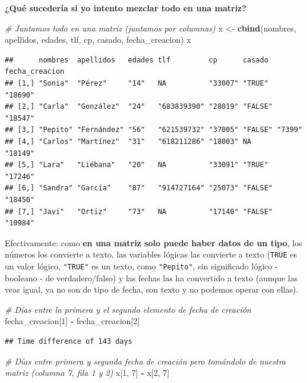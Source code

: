 \documentclass[11pt,]{book}
\newenvironment{Shaded}{\begin{snugshade}}{\end{snugshade}}
\newcommand{\CommentTok}[1]{\textcolor[rgb]{0.37,0.37,0.37}{\textit{#1}}}
\newcommand{\DecValTok}[1]{\textcolor[rgb]{0.06,0.06,0.06}{#1}}
\newcommand{\KeywordTok}[1]{\textcolor[rgb]{0.27,0.27,0.27}{\textbf{#1}}}
\newcommand{\NormalTok}[1]{#1}
\newcommand{\OperatorTok}[1]{\textcolor[rgb]{0.43,0.43,0.43}{\textbf{#1}}}
\newcommand{\StringTok}[1]{\textcolor[rgb]{0.5,0.5,0.5}{#1}}
\begin{document}
\textbf{¿Qué sucedería si yo intento mezclar todo en una matriz?}

\begin{Shaded}
\begin{Highlighting}[]
\CommentTok{# Juntamos todo en una matriz (juntamos por columnas)}
\NormalTok{x <-}\StringTok{ }\KeywordTok{cbind}\NormalTok{(nombres, apellidos, edades, tlf, cp, casado, fecha_creacion)}
\NormalTok{x}
\end{Highlighting}
\end{Shaded}

\begin{verbatim}
##      nombres  apellidos   edades tlf         cp      casado  fecha_creacion
## [1,] "Sonia"  "Pérez"     "14"   NA          "33007" "TRUE"  "18690"       
## [2,] "Carla"  "González"  "24"   "683839390" "28019" "FALSE" "18547"       
## [3,] "Pepito" "Fernández" "56"   "621539732" "37005" "FALSE" "7399"        
## [4,] "Carlos" "Martínez"  "31"   "618211286" "18003" NA      "18149"       
## [5,] "Lara"   "Liébana"   "20"   NA          "33091" "TRUE"  "17246"       
## [6,] "Sandra" "García"    "87"   "914727164" "25073" "FALSE" "18450"       
## [7,] "Javi"   "Ortiz"     "73"   NA          "17140" "FALSE" "10984"
\end{verbatim}

Efectivamente: como \textbf{en una matriz solo puede haber datos de un tipo}, los números los convierte a texto, las variables lógicas las convierte a texto (\texttt{TRUE} es un valor lógico, \texttt{"TRUE"} es un texto, como \texttt{"Pepito"}, sin significado lógico - booleano - de verdadero/falso) y las fechas las ha convertido a texto (aunque las veas igual, ya no son de tipo de fecha, son texto y no podemos operar con ellas).

\begin{Shaded}
\begin{Highlighting}[]
\CommentTok{# Días entre la primera y el segundo elemento de fecha de creación}
\NormalTok{fecha_creacion[}\DecValTok{1}\NormalTok{] }\OperatorTok{-}\StringTok{ }\NormalTok{fecha_creacion[}\DecValTok{2}\NormalTok{]}
\end{Highlighting}
\end{Shaded}

\begin{verbatim}
## Time difference of 143 days
\end{verbatim}

\begin{Shaded}
\begin{Highlighting}[]
\CommentTok{# Días entre primera y segunda fecha de creación pero tomándolo de nuestra matriz (columna 7, fila 1 y 2)}
\NormalTok{x[}\DecValTok{1}\NormalTok{, }\DecValTok{7}\NormalTok{] }\OperatorTok{-}\StringTok{ }\NormalTok{x[}\DecValTok{2}\NormalTok{, }\DecValTok{7}\NormalTok{]}
\end{Highlighting}
\end{Shaded}
\end{document}
